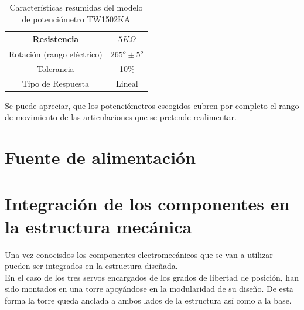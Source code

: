     \begin{table}[H]
        \caption{Características resumidas del modelo de potenciómetro TW1502KA}
        \label{tab:potenciometro}
            \begin{center}
                \begin{tabular}{ |c|c| }
                    \hline
                    Resistencia & $5K\Omega$  \\
                    \hline
                    Rotación (rango eléctrico) & $265^o \pm 5^o$\\
                    \hline
                    Tolerancia & 10\%  \\
                    \hline
                    Tipo de Respuesta & Lineal  \\
                    \hline
                \end{tabular}
            \end{center}
    \end{table}

    Se puede apreciar, que los potenciómetros escogidos cubren por completo el rango de movimiento de las articulaciones que se pretende realimentar.

\section{Fuente de alimentación} \label{sec:Electronica:fuente_alimentacion}

\section{Integración de los componentes en la estructura mecánica} \label{sec:Electronica:Integracion}

    Una vez conocisdos los componentes electromecánicos que se van a utilizar pueden ser integrados en la estructura diseñada.
    \\

    En el caso de los tres servos encargados de los grados de libertad de posición, han sido montados en una torre apoyándose en la modularidad de su diseño. De esta forma la torre queda anclada a ambos lados de la estructura así como a la base.
    \\

